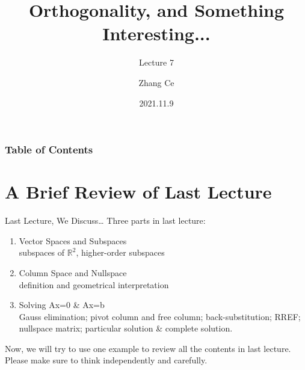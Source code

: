 \documentclass{beamer}
\title[Linear Algebra] %
{Orthogonality, and Something Interesting...}
\subtitle{Lecture 7}
\author[11910803@mail.sustech.edu.cn] %
{
    Zhang Ce
}
\institute[] %
{
    Department of Electrical and Electronic Engineering\\
    Southern University of Science and Technology
}
\date[2021.11.9] %
{2021.11.9}
\begin{document}
\frame{\titlepage}


\begin{frame}
\frametitle{Table of Contents}
\tableofcontents
\end{frame}
\section{A Brief Review of Last Lecture}
\begin{frame}{Last Lecture, We Discuss\dots}
Three parts in last lecture:
    \begin{enumerate}
        \item Vector Spaces and Subspaces\\
        subspaces of $\mathbb{R}^2$, higher-order subspaces
        \item Column Space and Nullspace\\
        definition and geometrical interpretation
        \item Solving Ax=0 \& Ax=b\\
        Gauss elimination; pivot column and free column; back-substitution; RREF; nullspace matrix; particular solution \& complete solution.
    \end{enumerate}

Now, we will try to use one example to review all the contents in last lecture. Please make sure to think independently and carefully.
\end{frame}
\end{document}
